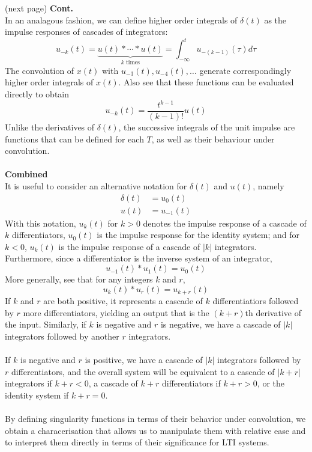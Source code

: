 \documentclass{report}
\begin{document}
(next page)\newpage
\noindent\textbf{Cont.}\\
In an analagous fashion, we can define higher order integrals of $\delta(t)$ as the impulse responses of cascades of integrators:
\begin{equation*}
u_{-k}(t)=\underbrace{u(t)*\cdots*u(t)}_{k\text{ times}}=\int^t_{-\infty}u_{-(k-1)}(\tau)d\tau
\end{equation*}
The convolution of $x(t)$ with $u_{-3}(t),u_{-4}(t),\ldots$ generate correspondingly higher order integrals of $x(t)$. Also see that these functions can be evaluated directly to obtain
\begin{equation*}
u_{-k}(t)=\frac{t^{k-1}}{(k-1)!}u(t)
\end{equation*}
Unlike the derivatives of $\delta(t)$, the successive integrals of the unit impulse are functions that can be defined for each $T$, as well as their behaviour under convolution.\\
\vspace{1mm}\\
\textbf{Combined}\\
It is useful to consider an alternative notation for $\delta(t)$ and $u(t)$, namely
\begin{align*}
\delta(t)&=u_0(t)\\
u(t)&=u_{-1}(t)
\end{align*}
With this notation, $u_k(t)$ for $k>0$ denotes the impulse response of a cascade of $k$ differentiators, $u_0(t)$ is the impulse response for the identity system; and for $k<0$, $u_k(t)$ is the impulse
response of a cascade of $|k|$ integrators. Furthermore, since a differentiator is the inverse system of an integrator,
\begin{equation*}
u_{-1}(t)*u_1(t)=u_0(t)
\end{equation*}
More generally, see that for any integers $k$ and $r$,
\begin{equation*}
u_k(t)*u_r(t)=u_{k+r}(t)
\end{equation*}
If $k$ and $r$ are both positive, it represents a cascade of $k$ differentiatiors followed by $r$ more differentiators, yielding an output that is the $(k+r)$th derivative of the input. Similarly, if $k$
is negative and $r$ is negative, we have a cascade of $|k|$ integrators followed by another $r$ integrators.\\
\vspace{1mm}\\
If $k$ is negative and $r$ is positive, we have a cascade of $|k|$ integrators followed by $r$ differentiators, and the overall system will be equivalent to a cascade of $|k+r|$ integrators if $k+r<0$, a
cascade of $k+r$ differentiators if $k+r>0$, or the identity system if $k+r=0$.\\
\vspace{1mm}\\
By defining singularity functions in terms of their behavior under convolution, we obtain a characerisation that allows us to manipulate them with relative ease and to interpret them directly in terms of
their significance for LTI systems.
\newpage
\end{document}
